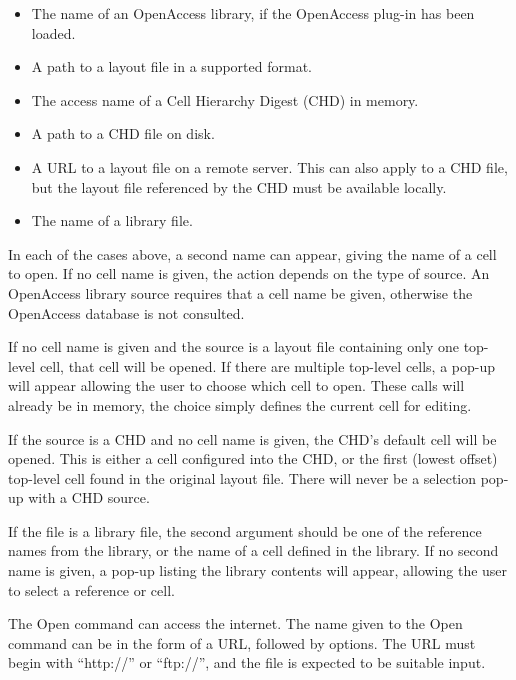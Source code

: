 \begin{itemize}
\ifoa
\item{The name of an OpenAccess library, if the OpenAccess     
plug-in has been loaded.}
\fi

\item{A path to a layout file in a supported format.}

\item{The access name of a Cell Hierarchy Digest (CHD) in memory.}

\item{A path to a CHD file on disk.}

\item{A URL to a layout file on a remote server.  This can also apply
to a CHD file, but the layout file referenced by the CHD must be
available locally.}

\item{The name of a library file.}
\end{itemize}

In each of the cases above, a second name can appear, giving the name
of a cell to open.  If no cell name is given, the action depends on
the type of source.
\ifoa
An OpenAccess library source requires that a cell name be given,
otherwise the OpenAccess database is not consulted.
\fi

If no cell name is given and the source is a layout file containing
only one top-level cell, that cell will be opened.  If there are
multiple top-level cells, a pop-up will appear allowing the user to
choose which cell to open.  These calls will already be in memory, the
choice simply defines the current cell for editing.

If the source is a CHD and no cell name is given, the CHD's default
cell will be opened.  This is either a cell configured into the CHD,
or the first (lowest offset) top-level cell found in the original
layout file.  There will never be a selection pop-up with a CHD
source.

If the file is a library file, the second argument should be one of
the reference names from the library, or the name of a cell defined in
the library.  If no second name is given, a pop-up listing the library
contents will appear, allowing the user to select a reference or cell.

The {\cb Open} command can access the internet.  The name given to the
{\cb Open} command can be in the form of a URL, followed by options. 
The URL must begin with ``{\vt http://}'' or ``{\vt ftp://}'', and the
file is expected to be suitable {\Xic} input.

